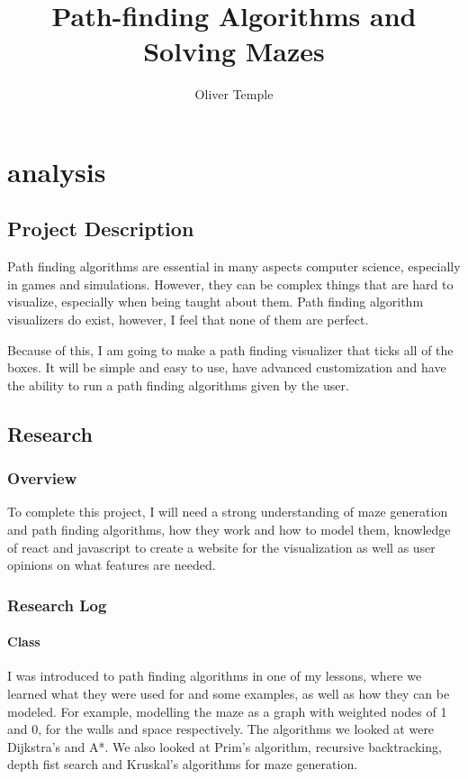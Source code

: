 \documentclass{article}
\title{Path-finding Algorithms and Solving Mazes}
\author{Oliver Temple}
\begin{document}
\maketitle
\tableofcontents

\section{analysis}
\subsection{Project Description}
Path finding algorithms are essential in many aspects computer science, especially in games and simulations. However, they can be complex things that are hard to visualize, especially when being taught about them. Path finding algorithm visualizers do exist, however, I feel that none of them are perfect.

Because of this, I am going to make a path finding visualizer that ticks all of the boxes. It will be simple and easy to use, have advanced customization and have the ability to run a path finding algorithms given by the user.

\subsection{Research}
\subsubsection{Overview}
To complete this project, I will need a strong understanding of maze generation and path finding algorithms, how they work and how to model them, knowledge of react and javascript to create a website for the visualization as well as user opinions on what features are needed.
\subsubsection{Research Log}
\paragraph*{Class}
I was introduced to path finding algorithms in one of my lessons, where we learned what they were used for and some examples, as well as how they can be modeled. For example, modelling the maze as a graph with weighted nodes of 1 and 0, for the walls and space respectively. The algorithms we looked at were Dijkstra's and A*. We also looked at Prim's algorithm, recursive backtracking, depth fist search and Kruskal's algorithms for maze generation.
\end{document}
